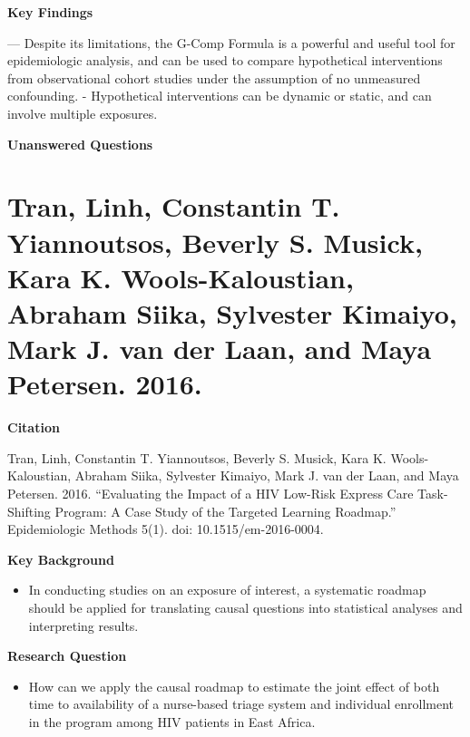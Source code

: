 \documentclass[
]{book}
\providecommand{\tightlist}{%
  \setlength{\itemsep}{0pt}\setlength{\parskip}{0pt}}
\begin{document}
\textbf{Key Findings}

--- Despite its limitations, the G-Comp Formula is a powerful and useful tool for epidemiologic analysis, and can be used to compare hypothetical interventions from observational cohort studies under the assumption of no unmeasured confounding.
- Hypothetical interventions can be dynamic or static, and can involve multiple exposures.

\textbf{Unanswered Questions}

\hypertarget{tran-linh-constantin-t.-yiannoutsos-beverly-s.-musick-kara-k.-wools-kaloustian-abraham-siika-sylvester-kimaiyo-mark-j.-van-der-laan-and-maya-petersen.-2016.}{%
\section{Tran, Linh, Constantin T. Yiannoutsos, Beverly S. Musick, Kara K. Wools-Kaloustian, Abraham Siika, Sylvester Kimaiyo, Mark J. van der Laan, and Maya Petersen. 2016.}\label{tran-linh-constantin-t.-yiannoutsos-beverly-s.-musick-kara-k.-wools-kaloustian-abraham-siika-sylvester-kimaiyo-mark-j.-van-der-laan-and-maya-petersen.-2016.}}

\textbf{Citation}

Tran, Linh, Constantin T. Yiannoutsos, Beverly S. Musick, Kara K. Wools-Kaloustian, Abraham Siika, Sylvester Kimaiyo, Mark J. van der Laan, and Maya Petersen. 2016. ``Evaluating the Impact of a HIV Low-Risk Express Care Task-Shifting Program: A Case Study of the Targeted Learning Roadmap.'' Epidemiologic Methods 5(1). doi: 10.1515/em-2016-0004.

\textbf{Key Background}

\begin{itemize}
\tightlist
\item
  In conducting studies on an exposure of interest, a systematic roadmap should be applied for translating causal questions into statistical analyses and interpreting results.
\end{itemize}

\textbf{Research Question}

\begin{itemize}
\tightlist
\item
  How can we apply the causal roadmap to estimate the joint effect of both time to availability of a nurse-based triage system and individual enrollment in the program among HIV patients in East Africa.
\end{itemize}
\end{document}
